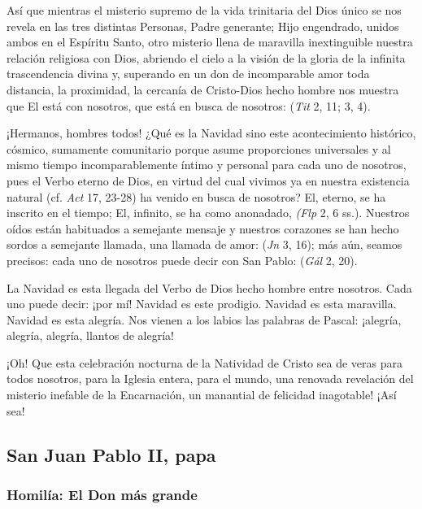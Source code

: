 Así que mientras el misterio supremo de la vida trinitaria del Dios único se nos revela en las tres distintas Personas, Padre generante; Hijo engendrado, unidos ambos en el Espíritu Santo, otro misterio llena de maravilla inextinguible nuestra relación religiosa con Dios, abriendo el cielo a la visión de la gloria de la infinita trascendencia divina y, superando en un don de incomparable amor toda distancia, la proximidad, la cercanía de Cristo-Dios hecho hombre nos muestra que El está con nosotros, que está en busca de nosotros:  (\emph{Tit} 2, 11; 3, 4).

¡Hermanos, hombres todos! ¿Qué es la Navidad sino este acontecimiento histórico, cósmico, sumamente comunitario porque asume proporciones universales y al mismo tiempo incomparablemente íntimo y personal para cada uno de nosotros, pues el Verbo eterno de Dios, en virtud del cual vivimos ya en nuestra existencia natural (cf. \emph{Act} 17, 23-28) ha venido en busca de nosotros? El, eterno, se ha inscrito en el tiempo; El, infinito, se ha como anonadado,  \emph{(Flp} 2, 6 ss.). Nuestros oídos están habituados a semejante mensaje y nuestros corazones se han hecho sordos a semejante llamada, una llamada de amor:  (\emph{Jn} 3, 16); más aún, seamos precisos: cada uno de nosotros puede decir con San Pablo:  (\emph{Gál} 2, 20).

La Navidad es esta llegada del Verbo de Dios hecho hombre entre nosotros. Cada uno puede decir: ¡por mí! Navidad es este prodigio. Navidad es esta maravilla. Navidad es esta alegría. Nos vienen a los labios las palabras de Pascal: ¡alegría, alegría, alegría, llantos de alegría!

¡Oh! Que esta celebración nocturna de la Natividad de Cristo sea de veras para todos nosotros, para la Iglesia entera, para el mundo, una renovada revelación del misterio inefable de la Encarnación, un manantial de felicidad inagotable! ¡Así sea!

\subsection{San Juan Pablo II, papa}

\subsubsection{Homilía: El Don más grande}

